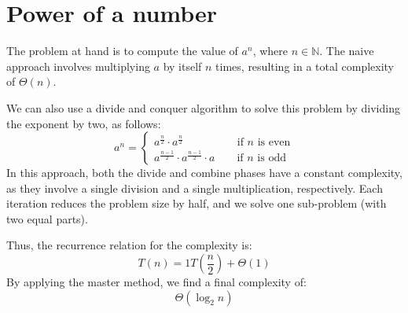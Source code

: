 \section{Power of a number}

The problem at hand is to compute the value of $a^n$, where $n\in\mathbb{N}$. 
The naive approach involves multiplying $a$ by itself $n$ times, resulting in a total complexity of $\Theta(n)$. 

We can also use a divide and conquer algorithm to solve this problem by dividing the exponent by two, as follows:
\[a^n=\begin{cases} a^\frac{n}{2}\cdot a^\frac{n}{2}  \:\:\:\:\qquad\qquad \text{if }n\text{ is even} \\ a^\frac{n-1}{2}\cdot a^\frac{n-1}{2} \cdot a \qquad \text{if }n\text{ is odd} \end{cases}\]
In this approach, both the divide and combine phases have a constant complexity, as they involve a single division and a single multiplication, respectively. 
Each iteration reduces the problem size by half, and we solve one sub-problem (with two equal parts).

Thus, the recurrence relation for the complexity is:
\[T(n)=1T\left(\dfrac{n}{2}\right)+\Theta(1)\]
By applying the master method, we find a final complexity of:
\[\Theta(\log_2n)\]